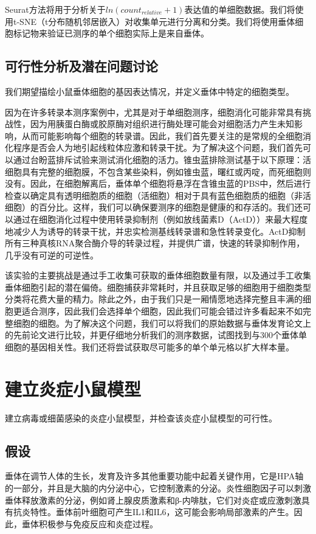   Seurat方法将用于分析关于$ln(count_{relative}+1)$表达值的单细胞数据。我们将使用t-SNE（t分布随机邻居嵌入）对收集单元进行分离和分类。我们将使用垂体细胞标记物来验证已测序的单个细胞实际上是来自垂体。

\subsection{可行性分析及潜在问题讨论}
  我们期望描绘小鼠垂体细胞的基因表达情况，并定义垂体中特定的细胞类型。

  因为在许多转录本测序案例中，尤其是对于单细胞测序，细胞消化可能非常具有挑战性，因为用胰蛋白酶或胶原酶对组织进行酶处理可能会对细胞活力产生未知影响，从而可能影响每个细胞的转录谱。因此，我们首先要关注的是常规的全细胞消化程序是否会人为地引起线粒体应激和转录干扰。为了解决这个问题，我们首先可以通过台盼蓝排斥试验来测试消化细胞的活力。锥虫蓝排除测试基于以下原理：活细胞具有完整的细胞膜，不包含某些染料，例如锥虫蓝，曙红或丙啶，而死细胞则没有。因此，在细胞解离后，垂体单个细胞将悬浮在含锥虫蓝的PBS中，然后进行检查以确定具有透明细胞质的细胞（活细胞）相对于具有蓝色细胞质的细胞（非活细胞）的百分比。这样，我们可以确保要测序的细胞是健康的和存活的。我们还可以通过在细胞消化过程中使用转录抑制剂（例如放线菌素D（ActD））来最大程度地减少人为诱导的转录干扰，并忠实检测基线转录谱和急性转录变化。ActD抑制所有三种真核RNA聚合酶介导的转录过程，并提供广谱，快速的转录抑制作用，几乎没有可逆的可逆性。

  该实验的主要挑战是通过手工收集可获取的垂体细胞数量有限，以及通过手工收集垂体细胞引起的潜在偏倚。细胞捕获非常耗时，并且获取足够的细胞用于细胞类型分类将花费大量的精力。除此之外，由于我们只是一厢情愿地选择完整且丰满的细胞更适合测序，因此我们会选择单个细胞，因此我们可能会错过许多看起来不如完整细胞的细胞。为了解决这个问题，我们可以将我们的原始数据与垂体发育论文上的先前论文进行比较，并更仔细地分析我们的测序数据，试图找到与300个垂体单细胞的基因相关性。我们还将尝试获取尽可能多的单个单元格以扩大样本量。

\section{建立炎症小鼠模型}
  建立病毒或细菌感染的炎症小鼠模型，并检查该炎症小鼠模型的可行性。
\subsection{假设}
  垂体在调节人体的生长，发育及许多其他重要功能中起着关键作用，它是HPA轴的一部分，并且是大脑的内分泌中心，它控制激素的分泌。炎性细胞因子可以刺激垂体释放激素的分泌，例如肾上腺皮质激素和β-内啡肽，它们对炎症或应激刺激具有抗炎特性。垂体前叶细胞可产生IL1和IL6，这可能会影响局部激素的产生。因此，垂体积极参与免疫反应和炎症过程。

